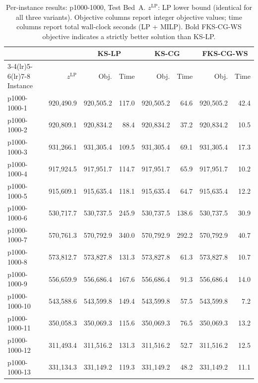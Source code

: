 \begin{table}[htbp]
\centering
\caption{Per-instance results: p1000-1000, Test Bed~A.
         $z^{\mathrm{LP}}$: LP lower bound (identical for all three variants).
         Objective columns report integer objective values;
         time columns report total wall-clock seconds (LP + MILP).
         Bold FKS-CG-WS objective indicates a strictly better solution than KS-LP.}
\label{tab:app_tba_1000_1000}
\footnotesize
\setlength{\tabcolsep}{3pt}
\begin{tabular}{lrrrrrrr}
\toprule
 & & \multicolumn{2}{c}{KS-LP} & \multicolumn{2}{c}{KS-CG} & \multicolumn{2}{c}{FKS-CG-WS} \\
\cmidrule(lr){3-4}\cmidrule(lr){5-6}\cmidrule(lr){7-8}
Instance & $z^{\mathrm{LP}}$ & Obj. & Time & Obj. & Time & Obj. & Time \\
\midrule
p1000-1000-1  &  920{,}490.9 &  920{,}505.2 & 117.0 &  920{,}505.2 &  64.6 &  920{,}505.2 &  42.4 \\
p1000-1000-2  &  920{,}809.1 &  920{,}834.2 &  88.4 &  920{,}834.2 &  37.2 &  920{,}834.2 &  10.5 \\
p1000-1000-3  &  931{,}266.1 &  931{,}305.4 & 109.5 &  931{,}305.4 &  69.1 &  931{,}305.4 &  17.3 \\
p1000-1000-4  &  917{,}924.5 &  917{,}951.7 & 114.7 &  917{,}951.7 &  65.9 &  917{,}951.7 &  10.2 \\
p1000-1000-5  &  915{,}609.1 &  915{,}635.4 & 118.1 &  915{,}635.4 &  64.7 &  915{,}635.4 &  12.2 \\
p1000-1000-6  &  530{,}717.7 &  530{,}737.5 & 245.9 &  530{,}737.5 & 138.6 &  530{,}737.5 &  30.9 \\
p1000-1000-7  &  570{,}761.3 &  570{,}792.9 & 340.0 &  570{,}792.9 & 292.2 &  570{,}792.9 &  40.7 \\
p1000-1000-8  &  573{,}812.7 &  573{,}827.8 & 131.3 &  573{,}827.8 &  61.3 &  573{,}827.8 &  10.7 \\
p1000-1000-9  &  556{,}659.9 &  556{,}686.4 & 167.6 &  556{,}686.4 &  91.3 &  556{,}686.4 &  14.0 \\
p1000-1000-10 &  543{,}588.6 &  543{,}599.8 & 149.4 &  543{,}599.8 &  57.5 &  543{,}599.8 &   7.2 \\
p1000-1000-11 &  350{,}058.3 &  350{,}069.3 & 115.6 &  350{,}069.3 &  76.5 &  350{,}069.3 &  13.2 \\
p1000-1000-12 &  311{,}493.4 &  311{,}516.2 & 131.3 &  311{,}516.2 &  52.7 &  311{,}516.2 &  12.5 \\
p1000-1000-13 &  331{,}134.3 &  331{,}149.2 & 119.3 &  331{,}149.2 &  48.2 &  331{,}149.2 &  11.1 \\

\end{tabular}
\end{table}

